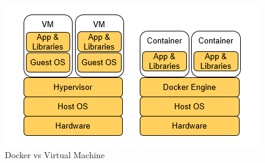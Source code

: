 \documentclass[twoside,english,brazilian]{UNISINOSartigo}
\begin{document}
\begin{itemize}
\begin{figure}
	\caption{Docker vs Virtual Machine}
	\label{fig:vmvsdocker}
	\centering%
	\begin{minipage}{.4\textwidth}
		\includegraphics[width=\textwidth]{vmvsdocker}
	\end{minipage}
\end{figure}


\end{itemize}
\end{document}
